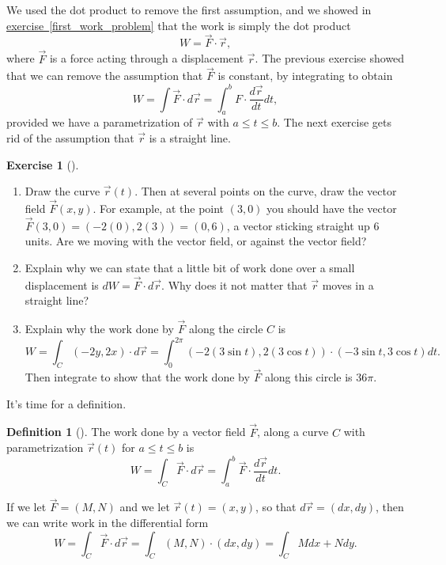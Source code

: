 \documentclass[10pt,]{book}
\theoremstyle{plain}
\theoremstyle{definition}
\newtheorem{definition}[theorem]{Definition}
\theoremstyle{definition}
\theoremstyle{definition}
\theoremstyle{definition}
\newtheorem{exploration}[project]{Exercise}
\theoremstyle{definition}
\numberwithin{equation}{section}
\begin{document}
We used the dot product to remove the first assumption, and we showed in \hyperref[first_work_problem]{exercise~\ref{first_work_problem}} that the work is simply the dot product%
\begin{equation*}
W=\vec F\cdot \vec r,
\end{equation*}
where \(\vec F\) is a force acting through a displacement \(\vec r\). The previous exercise showed that we can remove the assumption that \(\vec F\) is constant, by integrating to obtain%
\begin{equation*}
W=\int \vec F \cdot d\vec r = \int_a^b F\cdot \frac{d\vec r}{dt}dt,
\end{equation*}
provided we have a parametrization of \(\vec r\) with \(a\leq t\leq b\). The next exercise gets rid of the assumption that \(\vec r\) is a straight line.%
\begin{exploration}[]\label{exploration-191}
\leavevmode%
\begin{enumerate}[font=\bfseries,label=(\alph*),ref=\alph*]
\item\label{task-471} Draw the curve \(\vec r(t)\). Then at several points on the curve, draw the vector field \(\vec F(x,y)\).  For example, at the point \((3,0)\) you should have the vector \(\vec F(3,0)=(-2(0),2(3))=(0,6)\), a vector sticking straight up 6 units. Are we moving with the vector field, or against the vector field?%
\item\label{task-472} Explain why we can state that a little bit of work done over a small displacement is \(dW = \vec F\cdot d\vec r\). Why does it not matter that \(\vec r\) moves in a straight line?%
\item\label{task-473} Explain why the work done by \(\vec F\) along the circle \(C\)  is%
\begin{equation*}
W = \int_C\left(-2y,2x\right)\cdot d\vec r
= \int_0^{2\pi}\left(-2(3\sin t),2(3\cos t)\right)\cdot(-3\sin t, 3\cos t)dt.
\end{equation*}
Then integrate to show that the work done by \(\vec F\) along this circle is \(36\pi\).%
\end{enumerate}
\end{exploration}
It's time for a definition.%
\begin{definition}[{}]\label{definition-32}
The work done by a vector field \(\vec F\), along a curve \(C\) with parametrization \(\vec r(t)\) for \(a\leq t\leq b\) is%
\begin{equation*}
W = \int_C \vec F\cdot d\vec r= \int_a^b \vec F\cdot \frac{d\vec r}{dt}dt.
\end{equation*}
%
\par
If we let \(\vec F = (M,N)\) and we let \(\vec r(t)=(x,y)\), so that \(d\vec r = (dx,dy)\), then we can write work in the differential form%
\begin{equation*}
W = \int_C \vec F\cdot d\vec r= \int_C (M,N)\cdot (dx,dy) = \int_C Mdx+Ndy.
\end{equation*}
%
\end{definition}
\end{document}

